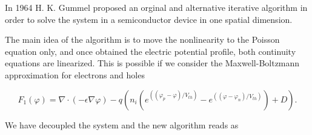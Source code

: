 In 1964 H. K. Gummel proposed an orginal and alternative iterative algorithm in order to solve the system  in a semiconductor device in one spatial dimension.

The main idea of the algorithm is to move the nonlinearity to the Poisson equation only, and once obtained the electric potential profile, both continuity equations are linearized. This is possible if we consider the Maxwell-Boltzmann approximation for electrons  and holes 

\begin{equation}
F_1(\varphi)  =  \nabla \cdot (-\epsilon \nabla \varphi) - q(n_i(e^{((\varphi_p-\varphi)/V_{th})}-e^{((\varphi-\varphi_n)/V_{th})})+D) .
\end{equation}


We have decoupled the system and the new algorithm reads as




